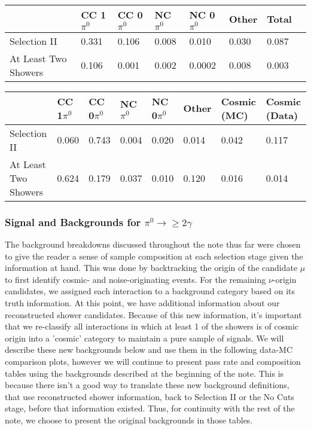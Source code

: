 \begin{table}[H]
\centering
{}
 \begin{tabular}{| l | l | l |l|l|l|l|l|}
 \hline
 & CC 1$\pi^0$ & CC 0$\pi^0$ & NC $\pi^0$ & NC 0$\pi^0$ & Other & Total \\ [0.1ex] \hline
Selection II & 0.331 & 0.106 & 0.008 & 0.010 & 0.030 & 0.087 \\
At Least Two Showers & 0.106 & 0.001 & 0.002 & 0.0002 & 0.008 & 0.003 \\ \hline
\end{tabular}
\end{table}

\begin{table}[H]
\centering
{}
 \begin{tabular}{| l | l | l |l|l|l|l|l|}
 \hline
 & CC 1$\pi^0$ & CC 0$\pi^0$ & NC $\pi^0$ & NC 0$\pi^0$ & Other & Cosmic (MC) & Cosmic (Data) \\ [0.1ex] \hline
Selection II & 0.060 & 0.743 & 0.004 & 0.020 & 0.014 & 0.042 & 0.117 \\
At Least Two Showers & 0.624 & 0.179 & 0.037 & 0.010 & 0.120 & 0.016 & 0.014\\ \hline
\end{tabular}
\end{table}

\subsubsection{Signal and Backgrounds for $\pi^0\rightarrow\geq 2 \gamma$}
The background breakdowns discussed throughout the note thus far were chosen to give the reader a sense of sample composition at each selection stage given the information at hand. This was done by backtracking the origin of the candidate $\mu$ to first identify cosmic- and noise-originating events. For the remaining $\nu$-origin candidates, we assigned each interaction to a background category based on its truth information. At this point, we have additional information about our reconstructed shower candidates.  Because of this new information, it's important that we re-classify all interactions in which at least 1 of the showers is of cosmic origin into a 'cosmic' category to maintain a pure sample of signals. We will describe these new backgrounds below and use them in the following data-MC comparison plots, however we will continue to present pass rate and composition tables using the backgrounds described at the beginning of the note.  This is because there isn't a good way to translate these new background definitions, that use reconstructed shower information, back to Selection II or the No Cuts stage, before that information existed. Thus, for continuity with the rest of the note, we choose to present the original backgrounds in those tables.  

